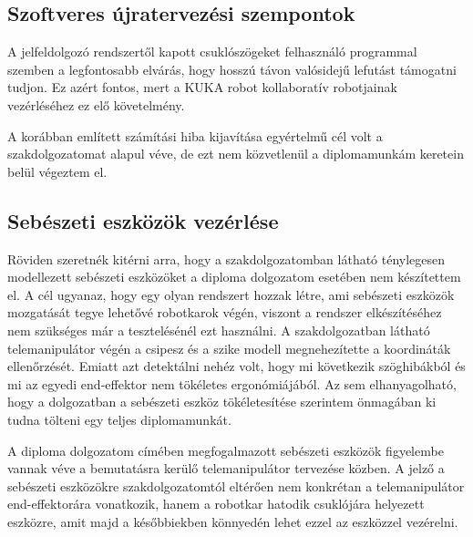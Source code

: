 \subsection{Szoftveres újratervezési szempontok}

A jelfeldolgozó rendszertől kapott csuklószögeket felhasználó programmal szemben a legfontosabb elvárás, hogy hosszú távon valósidejű lefutást támogatni tudjon. Ez azért fontos, mert a KUKA robot kollaboratív robotjainak vezérléséhez ez elő követelmény.

A korábban említett számítási hiba kijavítása egyértelmű cél volt a szakdolgozatomat alapul véve, de ezt nem közvetlenül a diplomamunkám keretein belül végeztem el.

\subsection{Sebészeti eszközök vezérlése}

Röviden szeretnék kitérni arra, hogy a szakdolgozatomban látható ténylegesen modellezett sebészeti eszközöket a diploma dolgozatom esetében nem készítettem el. A cél ugyanaz, hogy egy olyan rendszert hozzak létre, ami sebészeti eszközök mozgatását tegye lehetővé robotkarok végén, viszont a rendszer elkészítéséhez nem szükséges már a tesztelésénél ezt használni. A szakdolgozatban látható telemanipulátor végén a csipesz és a szike modell megnehezítette a koordináták ellenőrzését. Emiatt azt detektálni nehéz volt, hogy mi következik szöghibákból és mi az egyedi end-effektor nem tökéletes ergonómiájából. Az sem elhanyagolható, hogy a dolgozatban a sebészeti eszköz tökéletesítése szerintem önmagában ki tudna tölteni egy teljes diplomamunkát.


A diploma dolgozatom címében megfogalmazott sebészeti eszközök figyelembe vannak véve a bemutatásra kerülő telemanipulátor tervezése közben. A jelző a sebészeti eszközökre szakdolgozatomtól eltérően nem konkrétan a telemanipulátor end-effektorára vonatkozik, hanem a robotkar hatodik csuklójára helyezett eszközre, amit majd a későbbiekben könnyedén lehet ezzel az eszközzel vezérelni.